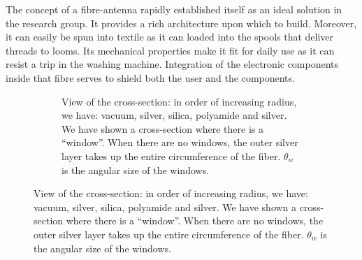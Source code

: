 The concept of a fibre-antenna rapidly established itself
as an ideal solution in the research group. It provides a rich
architecture upon which to build. Moreover, it can easily 
be spun into textile as it can loaded into the spools that 
deliver threads to looms. Its mechanical properties make it
fit for daily use as it can resist a trip in the washing machine. 
Integration of the electronic components inside that fibre 
serves to shield both the user and the components. 

\begin{figure}
  \centering
  \begin{subfigure}[b]{\textwidth}
    \centering
   \vspace{0.25cm}
   \caption{View of the cross-section: in order of increasing radius, we have: vacuum, silver, silica, polyamide and silver.
	    We have shown a cross-section where there is a ``window''. When there are no windows, 
	    the outer silver layer takes up the entire circumference of the fiber.
	    $\theta_w$ is the angular size of the windows.}
   \label{fig:antenna.fibre-antenna.xsection}
  \end{subfigure}
  

\end{figure}
